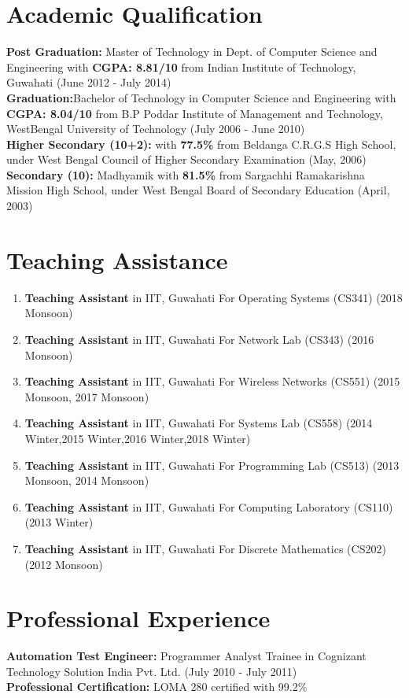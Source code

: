 \documentclass{res}
\begin{document}
\begin{resume}
\section{Academic Qualification} 
	{\bf Post Graduation:} Master of Technology in Dept. of Computer Science and Engineering with {\bf CGPA: 8.81/10} from Indian Institute of Technology, Guwahati (June 2012 - July 2014)\\[3ex]
	{\bf Graduation:}Bachelor of Technology in Computer Science and Engineering with {\bf CGPA: 8.04/10} from B.P Poddar Institute of Management and Technology, WestBengal University of Technology (July 2006 - June 2010)\\[3ex]
	{\bf Higher Secondary (10+2):} with {\bf 77.5\%} from Beldanga C.R.G.S High School, under West Bengal Council of Higher Secondary Examination (May, 2006)\\[3ex]
	{\bf Secondary (10):} Madhyamik with {\bf 81.5\%} from Sargachhi Ramakarishna Mission High School, under West Bengal Board of Secondary Education (April, 2003)
\section{Teaching Assistance}	
	\begin{enumerate}
	 \item {\bf Teaching Assistant} in IIT, Guwahati For Operating Systems (CS341) (2018 Monsoon)
	 \item {\bf Teaching Assistant} in IIT, Guwahati For Network Lab (CS343) (2016 Monsoon)
	 \item {\bf Teaching Assistant} in IIT, Guwahati For Wireless Networks (CS551) (2015 Monsoon, 2017 Monsoon)
	 \item {\bf Teaching Assistant} in IIT, Guwahati For Systems Lab (CS558) (2014 Winter,2015 Winter,2016 Winter,2018 Winter)
	 \item {\bf Teaching Assistant} in IIT, Guwahati For Programming Lab (CS513) (2013 Monsoon, 2014 Monsoon)
	 \item {\bf Teaching Assistant} in IIT, Guwahati For Computing Laboratory (CS110) (2013 Winter)
	 \item {\bf Teaching Assistant} in IIT, Guwahati For Discrete Mathematics (CS202)  (2012 Monsoon)
	\end{enumerate}
\section{Professional Experience}
	{\bf Automation Test Engineer:} Programmer Analyst Trainee in Cognizant Technology Solution India Pvt. Ltd. (July 2010 - July 2011)\\[3ex]
	{\bf Professional Certification:} LOMA 280 certified with 99.2\%         

\end{resume}
\end{document}
